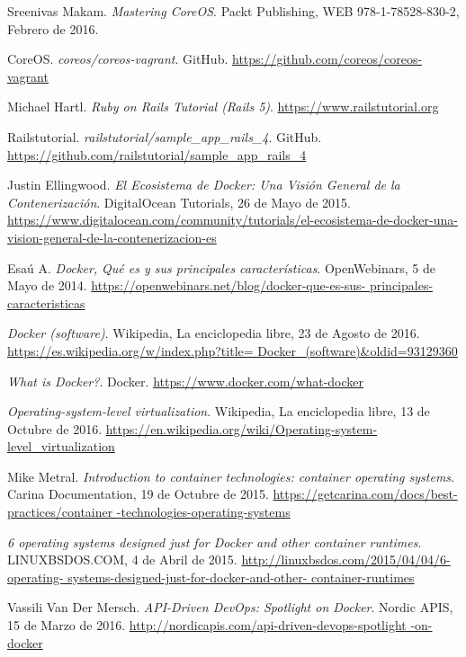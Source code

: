 \begin{thebibliography}{9}
Sreenivas Makam.
\textit{Mastering CoreOS}. 
Packt Publishing, WEB 978-1-78528-830-2, Febrero de 2016.

CoreOS.
\textit{coreos/coreos-vagrant}. GitHub.
\url{https://github.com/coreos/coreos-vagrant}

Michael Hartl.
\textit{Ruby on Rails Tutorial (Rails 5)}. 
\url{https://www.railstutorial.org}

Railstutorial.
\textit{railstutorial/sample\_app\_rails\_4}. GitHub.
\url{https://github.com/railstutorial/sample\_app\_rails\_4}
 
Justin Ellingwood.
\textit{El Ecosistema de Docker: Una Visión General de la Contenerización}. 
DigitalOcean Tutorials, 26 de Mayo de 2015.
\url{https://www.digitalocean.com/community/tutorials/el-ecosistema-de-docker-una-vision-general-de-la-contenerizacion-es}

Esaú A.
\textit{Docker, Qué es y sus principales características}. 
OpenWebinars, 5 de Mayo de 2014.
\url{https://openwebinars.net/blog/docker-que-es-sus-
principales-caracteristicas}


\textit{Docker (software)}. 
Wikipedia, La enciclopedia libre, 23 de Agosto de 2016.
\url{https://es.wikipedia.org/w/index.php?title= Docker\_(software)\&oldid=93129360}

\textit{What is Docker?}. 
Docker.
\url{https://www.docker.com/what-docker}

\textit{Operating-system-level virtualization}. 
Wikipedia, La enciclopedia libre, 13 de Octubre de 2016.
\url{https://en.wikipedia.org/wiki/Operating-system-
level\_virtualization}

Mike Metral.
\textit{Introduction to container technologies: container operating systems}. 
Carina Documentation, 19 de Octubre de 2015.
\url{https://getcarina.com/docs/best-practices/container
-technologies-operating-systems}

\textit{6 operating systems designed just for Docker and other container runtimes}. 
LINUXBSDOS.COM, 4 de Abril de 2015.
\url{http://linuxbsdos.com/2015/04/04/6-operating-
systems-designed-just-for-docker-and-other-
container-runtimes}

Vassili Van Der Mersch.
\textit{API-Driven DevOps: Spotlight on Docker}. 
Nordic APIS, 15 de Marzo de 2016.
\url{http://nordicapis.com/api-driven-devops-spotlight
-on-docker}


\end{thebibliography}
